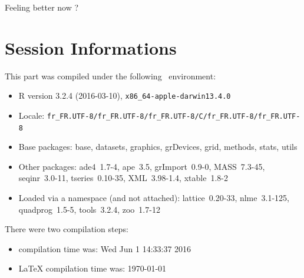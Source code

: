 \documentclass{article}
\begin{document}
\noindent Feeling better now ?


\section*{Session Informations}

\begin{scriptsize}

This part was compiled under the following \Rlogo{}~environment:

\begin{itemize}\raggedright
  \item R version 3.2.4 (2016-03-10), \verb|x86_64-apple-darwin13.4.0|
  \item Locale: \verb|fr_FR.UTF-8/fr_FR.UTF-8/fr_FR.UTF-8/C/fr_FR.UTF-8/fr_FR.UTF-8|
  \item Base packages: base, datasets, graphics, grDevices, grid,
    methods, stats, utils
  \item Other packages: ade4~1.7-4, ape~3.5, grImport~0.9-0,
    MASS~7.3-45, seqinr~3.0-11, tseries~0.10-35, XML~3.98-1.4,
    xtable~1.8-2
  \item Loaded via a namespace (and not attached): lattice~0.20-33,
    nlme~3.1-125, quadprog~1.5-5, tools~3.2.4, zoo~1.7-12
\end{itemize}
There were two compilation steps:

\begin{itemize}
  \item \Rlogo{} compilation time was: Wed Jun  1 14:33:37 2016
  \item \LaTeX{} compilation time was: \today
\end{itemize}

\end{scriptsize}


\clearpage
{}


\end{document}
